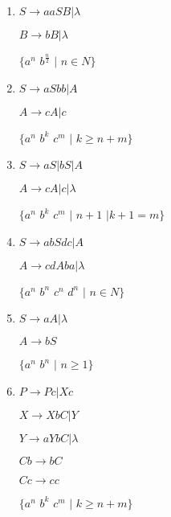 \begin{question}

\begin{enumerate}[label=\textbf{\alph*})]
  \item 
  $S \rightarrow aaSB | \lambda$
  
  $B \rightarrow bB | \lambda$
  
  $\{a^{n}$ $b^{\frac{n}{2}}$ $ |$ $ n \in N \}$
  
  \item 
  $S \rightarrow aSbb | A$
  
  $A \rightarrow cA | c$
  
  $\{a^{n}$ $b^{k}$ $c^{m}$ $ |$ $ k \geq n + m \}$
  
  \item 
  $S \rightarrow aS | bS | A $
  
  $A \rightarrow cA | c | \lambda $
  
  $\{a^{n}$ $b^{k}$ $c^{m}$ $ |$ $ n + 1$ $ | k + 1 = m \}$
  
  \item 
  $S \rightarrow abSdc | A $
  
  $A \rightarrow cdAba | \lambda$
  
    $\{a^{n}$ $b^{n}$ $c^{n}$ $d^{n}$ $ |$ $ n \in N \}$
  
  \item 
  $S \rightarrow aA | \lambda$
  
  $A \rightarrow bS $
  
  $\{a^{n}$ $b^{n}$ $ |$ $ n \geq 1 \}$
  
  \item 
  $P \rightarrow Pc | Xc $
  
  $X \rightarrow XbC | Y $
  
  $Y \rightarrow aYbC | \lambda $
  
  $Cb \rightarrow bC $
  
  $Cc \rightarrow cc $
  
  $\{a^{n}$ $b^{k}$ $c^{m}$ $ |$ $ k \geq n + m \}$
  
\end{enumerate}
  
\end{question}
